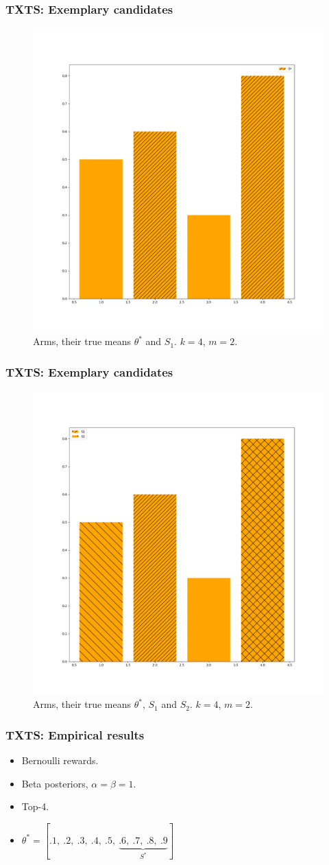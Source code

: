 \documentclass[aspectratio=43]{beamer}
\begin{document}
\begin{frame}
  \frametitle{TXTS: Exemplary candidates}
  \begin{figure}[h]
    \centering
    \includegraphics[width=.5\textwidth]{191127-bandits_2.png}
    \caption{Arms, their true means $\theta^*$ and $S_1$. $k=4$, $m=2$.}
  \end{figure}
\end{frame}

\begin{frame}
  \frametitle{TXTS: Exemplary candidates}
  \begin{figure}[h]
    \centering
    \includegraphics[width=.5\textwidth]{191127-txts_2.png}
    \caption{Arms, their true means $\theta^*$, $S_1$ and $S_2$. $k=4$, $m=2$.}
  \end{figure}
\end{frame}

\begin{frame}
\frametitle{TXTS: Empirical results}
\begin{itemize}[<+->]
  \item Bernoulli rewards.
  \item Beta posteriors, $\alpha = \beta = 1$.
  \item Top-4.
  \item $\theta^* = [.1,\ .2,\ .3,\ .4,\ .5,\ \underbrace{.6,\ .7,\ .8,\
          .9}_\text{$S^*$}]$
\end{itemize}
\end{frame}
\end{document}
